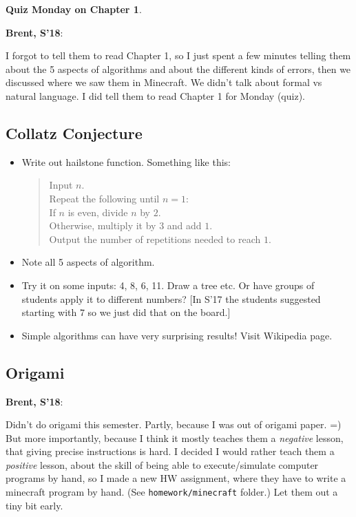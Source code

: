 \documentclass{article}
\newenvironment{reflect}[1]
{
  \noindent
  \begin{lrbox}{\reflectbox}
    \begin{minipage}[t]{\textwidth}
      \textbf{#1}:
}{
    \end{minipage}
  \end{lrbox}
  \fbox{\usebox{\reflectbox}}
}
\begin{document}
\textbf{Quiz Monday on Chapter 1}.

\begin{reflect}{Brent, S'18}
  I forgot to tell them to read Chapter 1, so I just spent a few
  minutes telling them about the 5 aspects of algorithms and about the
  different kinds of errors, then we discussed where we saw them in
  Minecraft.  We didn't talk about formal vs natural language.  I did
  tell them to read Chapter 1 for Monday (quiz).
\end{reflect}

\subsection*{Collatz Conjecture}

\begin{itemize}
\item Write out hailstone function. Something like this:
  \begin{quote}
    Input $n$. \\
    Repeat the following until $n = 1$: \\
    \mbox{} \quad If $n$ is even, divide $n$ by $2$. \\
    \mbox{} \quad Otherwise, multiply it by $3$ and add $1$. \\
    Output the number of repetitions needed to reach $1$.
  \end{quote}
\item Note all 5 aspects of algorithm.
\item Try it on some inputs: 4, 8, 6, 11. Draw a tree etc.  Or have
  groups of students apply it to different numbers?  [In S'17 the
  students suggested starting with $7$ so we just did that on the board.]
\item Simple algorithms can have very surprising results!  Visit
  Wikipedia page.
\end{itemize}

\subsection*{Origami}

\begin{reflect}{Brent, S'18}
  Didn't do origami this semester.  Partly, because I was out of
  origami paper. =) But more importantly, because I think it mostly
  teaches them a \emph{negative} lesson, that giving precise
  instructions is hard.  I decided I would rather teach them a
  \emph{positive} lesson, about the skill of being able to
  execute/simulate computer programs by hand, so I made a new HW
  assignment, where they have to write a minecraft program by hand.
  (See \texttt{homework/minecraft} folder.)  Let them out a tiny bit
  early.
\end{reflect}
\end{document}
